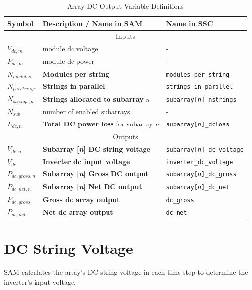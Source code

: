 \documentclass[12pt,letterpaper]{article}
\begin{document}
\begin{table}
\begin{center}
\caption{Array DC Output Variable Definitions}
\begin{tabular}{lll}
\midrule
Symbol & Description / \textbf{Name in SAM} & Name in SSC \\
\midrule
\multicolumn{3}{c}{Inputs}\\
$V_{dc,m}$ & module dc voltage & - \\
$P_{dc,m}$ & module dc power & - \\
$N_{modules}$ & \textbf{Modules per string} & \texttt{modules\_per\_string} \\
$N_{parstrings}$ & \textbf{Strings in parallel} & \texttt{strings\_in\_parallel} \\
$N_{strings,n}$ & \textbf{Strings allocated to subarray} \textit{n} & \texttt{subarray[\textit{n}]\_nstrings} \\
$N_{sub}$ & number of enabled subarrays & - \\
$L_{dc,n}$ & \textbf{Total DC power loss} for subarray \textit{n} &  \texttt{subarray[\textit{n}]\_dcloss} \\
\midrule
\multicolumn{3}{c}{Outputs}\\
$V_{dc,n}$ & \textbf{Subarray [\textit{n}] DC string voltage} & \texttt{subarray[\textit{n}]\_dc\_voltage} \\
$V_{dc}$ & \textbf{Inverter dc input voltage} & \texttt{inverter\_dc\_voltage} \\
$P_{dc,gross,n}$ & \textbf{Subarray [\textit{n}] Gross DC output} &  \texttt{subarray[\textit{n}]\_dc\_gross} \\
$P_{dc,net,n}$ & \textbf{Subarray [\textit{n}] Net DC output} &  \texttt{subarray[\textit{n}]\_dc\_net} \\
$P_{dc,gross}$ & \textbf{Gross dc array output} & \texttt{dc\_gross} \\
$P_{dc,net}$ & \textbf{Net dc array output} & \texttt{dc\_net} \\
\hline
\end{tabular}
\label{tab-arraydcoutputvars}
\end{center}
\end{table}

\section{DC String Voltage}\label{sec-dcstringvoltage}

SAM calculates the array's DC string voltage in each time step to determine the inverter's input voltage.
\end{document}
